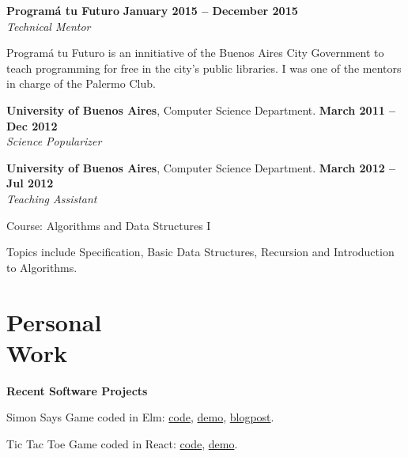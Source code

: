 \documentclass[margin,line]{resume}
\begin{document}
\begin{resume}
\textbf{Program\'a tu Futuro} \hfill \textbf{January 2015 --  December 2015}
\\
\textsl{Technical Mentor} \hfill 
\begin{list2}
	\item Program\'a tu Futuro is an innitiative of the Buenos Aires City Government to teach programming for free in the city's public libraries. I was one of the mentors in charge of the Palermo Club.
\end{list2}\vspace{-1.5mm}

\textbf{University of Buenos Aires}, Computer Science Department. \hfill \textbf{March 2011 --  Dec 2012}
\\
\textsl{Science Popularizer} \hfill 

\textbf{University of Buenos Aires}, Computer Science Department. \hfill \textbf{March 2012 --  Jul 2012}
\\
\textsl{Teaching Assistant} \hfill
\begin{list2}
	\item Course: Algorithms and Data Structures I
	\item Topics include Specification, Basic Data Structures, Recursion and Introduction to Algorithms.
\end{list2}\vspace{-1.5mm}

\vspace{2mm}
\section{\mysidestyle Personal\\Work}

\textbf{Recent Software Projects}
\begin{list2}
\item Simon Says Game coded in Elm: \href{https://github.com/carohadad/simon-elm}{code}, \href{https://carohadad.github.io/simon-elm/}{demo}, \href{https://medium.com/@carohadad/mi-primer-programa-en-elm-574ce6a445c3}{blogpost}.

\item Tic Tac Toe Game coded in React: \href{https://github.com/carohadad/tic-tac-toe-react}{code}, \href{https://carohadad.github.io/tic-tac-toe-react/}{demo}.


\end{list2}
\end{resume}
\end{document}
